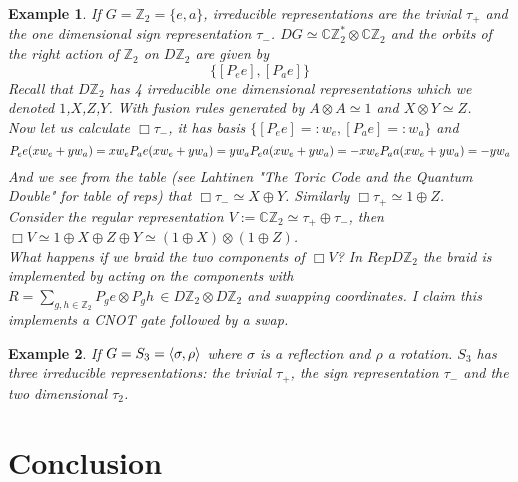 \documentclass{article}
\newtheorem{example}{Example}
\begin{document}
\begin{example}
If $G=\mathbb{Z}_2= \{e,a\}$, irreducible representations are the trivial $\tau_+$ and the one dimensional sign representation $\tau_-$. $DG \simeq \mathbb{C}\mathbb{Z}_2^* \otimes \mathbb{C}\mathbb{Z}_2$ and the orbits of the right action of $\mathbb{Z}_2$ on $D\mathbb{Z}_2$ are given by
$$ \{ [P_ee], [P_ae] \}$$
Recall that $D\mathbb{Z}_2$ has 4 irreducible one dimensional representations which we denoted $1$,$X$,$Z$,$Y$. With fusion rules generated by $A \otimes A \simeq 1$ and $X \otimes Y \simeq Z$. \\
Now let us calculate $\Box \tau_-$, it has basis $\{[P_ee] =:w_e, [P_ae] =:w_a \}$ and 
\begin{equation*}
P_ee(xw_e + yw_a)= xw_e \\
P_ae(xw_e + yw_a)= yw_a \\
P_ea(xw_e + yw_a)= -xw_e \\ 
P_aa(xw_e + yw_a)= -yw_a
\end{equation*}
And we see from the table (see Lahtinen "The Toric Code and the Quantum Double" for table of reps) that $\Box \tau_- \simeq X \oplus Y$. Similarly $\Box \tau_+ \simeq 1 \oplus Z$. \\
Consider the regular representation $V := \mathbb{C}\mathbb{Z}_2 \simeq \tau_+ \oplus \tau_-$, then $\Box V \simeq 1 \oplus X \oplus Z \oplus Y \simeq (1 \oplus X) \otimes (1 \oplus Z) $.\\
What happens if we braid the two components of $\Box V$? In $RepD\mathbb{Z}_2$ the braid is implemented by acting on the components with $R=\sum_{g,h\in\mathbb{Z}_2} P_ge \otimes P_gh \, \in D\mathbb{Z}_2\otimes D\mathbb{Z}_2$ and swapping coordinates. I claim this implements a CNOT gate followed by a swap.
\end{example}

\begin{example}
If $G=S_3=\braket{\sigma,\rho}$ where $\sigma$ is a reflection and $\rho$ a rotation. $S_3$ has three irreducible representations: the trivial $\tau_+$, the sign representation $\tau_-$ and the two dimensional $\tau_2$.
\end{example}



\section{Conclusion}
\end{document}
